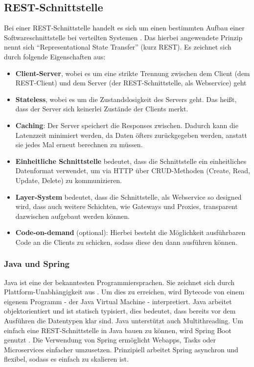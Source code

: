 	\subsection{REST-Schnittstelle}
	Bei einer REST-Schnittstelle handelt es sich um einen bestimmten Aufbau einer Softwareschnittstelle bei verteilten Systemen \cite{Patni2017}. Das hierbei angewendete Prinzip nennt sich \enquote{Representational State Transfer} (kurz REST). Es zeichnet sich durch folgende Eigenschaften aus:
	\begin{itemize}
		\item \textbf{Client-Server}, wobei es um eine strikte Trennung zwischen dem Client (dem REST-Client) und dem Server (der REST-Schnittstelle, als Webservice) geht
		\item \textbf{Stateless}, wobei es um die Zustandslosigkeit des Servers geht. Das heißt, dass der Server sich keinerlei Zustände der Clients merkt.
		\item \textbf{Caching}: Der Server speichert die Responses zwischen. Dadurch kann die Latenzzeit minimiert werden, da Daten öfters zurückgegeben werden, anstatt sie jedes Mal erneut berechnen zu müssen.
		\item \textbf{Einheitliche Schnittstelle} bedeutet, dass die Schnittstelle ein einheitliches Datenformat verwendet, um via HTTP über CRUD-Methoden (Create, Read, Update, Delete) zu kommunizieren.
		\item \textbf{Layer-System} bedeutet, dass die Schnittstelle, als Webservice so designed wird, dass auch weitere Schichten, wie Gateways und Proxies, transparent dazwischen aufgebaut werden können.
		\item \textbf{Code-on-demand} (optional): Hierbei besteht die Möglichkeit ausführbaren Code an die Clients zu schicken, sodass diese den dann ausführen können.
	\end{itemize}
	\label{code:rest}
		\subsubsection{Java und Spring}
		Java ist eine der bekanntesten Programmiersprachen. Sie zeichnet sich durch Plattform-Unabhängigkeit aus \cite{jdkDocs}. Um dies zu erreichen, wird Bytecode von einem eigenem Programm - der Java Virtual Machine - interpretiert. Java arbeitet objektorientiert und ist statisch typisiert, dies bedeutet, dass bereits vor dem Ausführen die Datentypen klar sind. Java unterstützt auch Multithreading. Um einfach eine REST-Schnittstelle in Java bauen zu können, wird Spring Boot genutzt \cite{springDocs}. Die Verwendung von Spring ermöglicht Webapps, Tasks oder Microservices einfacher umzusetzen. Prinzipiell arbeitet Spring asynchron und flexibel, sodass es einfach zu skalieren ist. 
		
